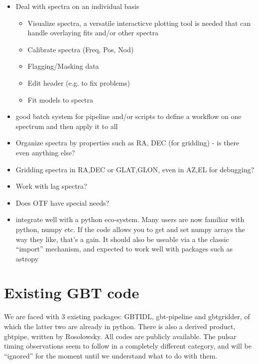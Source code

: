 \documentclass[12pt,a4paper]{article}
\begin{document}
\begin{itemize}

\item Deal with spectra on an individual basis
  \begin{itemize}
\item Visualize spectra, a versatile interacticve plotting tool is needed
  that can handle overlaying fits and/or other spectra
\item Calibrate spectra (Freq, Pos, Nod)

\item Flagging/Masking data

\item Edit header (e.g. to fix problems)  

\item Fit models to spectra


  \end{itemize}


\item good batch system for pipeline and/or scripts to define a workflow on one spectrum
  and then apply it to all
  

  
\item Organize spectra by properties such as RA, DEC (for gridding) - is there even anything else?

\item Gridding spectra in RA,DEC or GLAT,GLON, even in AZ,EL for debugging?

\item Work with lag spectra?

\item Does OTF have special needs?

\item integrate well with a python eco-system. Many users are now familiar with
  python, numpy etc.  If the code allows you to get and set numpy arrays the way
  they like, that's a gain. It should also be useable via a the classic ``import''
  mechanism, and expected to work well with packages such as astropy
\end{itemize}


\section{Existing GBT code}


We are faced with 3 existing packages: GBTIDL, gbt-pipeline and
gbtgridder, of which the latter two are already in python. There is also
a derived product, gbtpipe, written by Rosolowsky. All codes are
publicly available. The pulsar timing observations seem to follow
in a completely different category, and will be ``ignored'' for the
moment until we understand what to do with them.
\end{document}
